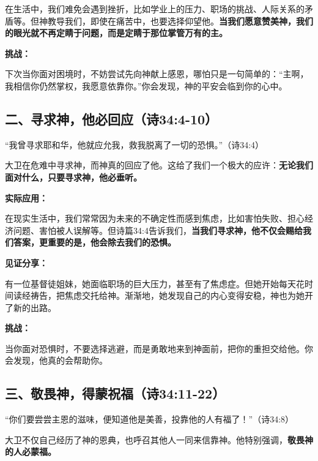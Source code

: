 \documentclass[a4paper, 12pt]{article}
\begin{document}
在生活中，我们难免会遇到挫折，比如学业上的压力、职场的挑战、人际关系的矛盾等。但神教导我们，即使在痛苦中，也要选择仰望他。\textbf{当我们愿意赞美神，我们的眼光就不再定睛于问题，而是定睛于那位掌管万有的主。}

\vspace{0.2cm}

\textbf{挑战：}

下次当你面对困境时，不妨尝试先向神献上感恩，哪怕只是一句简单的：“主啊，我相信你仍然掌权，我愿意依靠你。”你会发现，神的平安会临到你的心中。

\subsection*{二、寻求神，他必回应（诗34:4-10）}
\hspace{0.6cm}“我曾寻求耶和华，他就应允我，救我脱离了一切的恐惧。”（诗34:4）

大卫在危难中寻求神，而神真的回应了他。这给了我们一个极大的应许：\textbf{无论我们面对什么，只要寻求神，他必垂听。}

\vspace{0.2cm}

\textbf{实际应用：}

在现实生活中，我们常常因为未来的不确定性而感到焦虑，比如害怕失败、担心经济问题、害怕被人误解等。但诗篇34:4告诉我们，\textbf{当我们寻求神，他不仅会赐给我们答案，更重要的是，他会除去我们的恐惧。}

\vspace{0.2cm}

\textbf{见证分享：}

有一位基督徒姐妹，她面临职场的巨大压力，甚至有了焦虑症。但她开始每天花时间读经祷告，把焦虑交托给神。渐渐地，她发现自己的内心变得安稳，神也为她开了新的出路。

\vspace{0.2cm}

\textbf{挑战：}

当你面对恐惧时，不要选择逃避，而是勇敢地来到神面前，把你的重担交给他。你会发现，他真的会帮助你。

\subsection*{三、敬畏神，得蒙祝福（诗34:11-22）}
\hspace{0.6cm}“你们要尝尝主恩的滋味，便知道他是美善，投靠他的人有福了！”（诗34:8）

大卫不仅自己经历了神的恩典，也呼召其他人一同来信靠神。他特别强调，\textbf{敬畏神的人必蒙福。}
\end{document}

